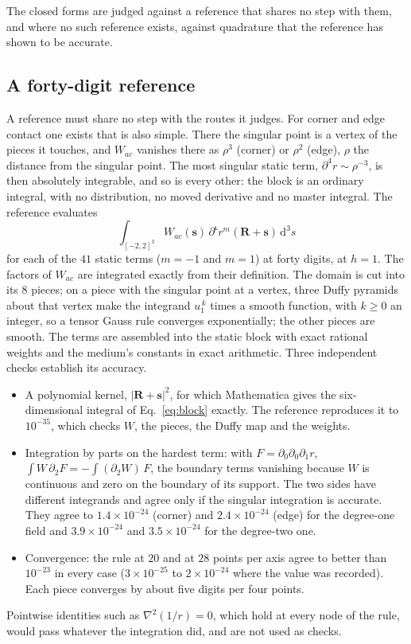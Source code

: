 \documentclass[11pt,a4paper]{article}
\newcommand{\bR}{\mathbf{R}}
\newcommand{\bs}{\mathbf{s}}
\newcommand{\biota}{\boldsymbol{\iota}}
\newcommand{\dd}{\mathrm{d}}
\begin{document}
The closed forms are judged against a reference that shares no step with them, and where no such
reference exists, against quadrature that the reference has shown to be accurate.

\subsection{A forty-digit reference}\label{sec:reference}

A reference must share no step with the routes it judges. For corner and edge contact one exists that is
also simple. There the singular point is a vertex of the pieces it touches, and $W_{ac}$ vanishes there as
$\rho^3$ (corner) or $\rho^2$ (edge), $\rho$ the distance from the singular point. The most singular static
term, $\partial^4r\sim\rho^{-3}$, is then absolutely integrable, and so is every other: the block is an
ordinary integral, with no distribution, no moved derivative and no master integral.
The reference evaluates
\begin{equation}\label{eq:reference}
  \int_{[-2,2]^3}W_{ac}(\bs)\,\partial^{\biota} r^m(\bR+\bs)\,\dd^3s
\end{equation}
for each of the $41$ static terms ($m=-1$ and $m=1$) at forty digits, at $h=1$. The factors of $W_{ac}$
are integrated exactly from their definition. The domain is cut into its $8$ pieces; on a piece with the
singular point at a vertex, three Duffy pyramids \citep{Duffy1982} about that vertex make the integrand
$u_1^{\,k}$ times a smooth function, with $k\ge0$ an integer, so a tensor Gauss rule converges
exponentially; the other pieces are smooth. The terms are assembled into the static block with exact
rational weights and the medium's constants in exact arithmetic. Three independent checks establish its
accuracy.
\begin{itemize}
  \item[(a)] A polynomial kernel, $|\bR+\bs|^2$, for which Mathematica gives the six-dimensional integral
  of Eq.~\eqref{eq:block} exactly. The reference reproduces it to $10^{-35}$, which checks $W$, the
  pieces, the Duffy map and the weights.
  \item[(b)] Integration by parts on the hardest term: with $F=\partial_0\partial_0\partial_1r$,
  $\int W\,\partial_2F=-\int(\partial_2W)\,F$, the boundary terms vanishing because $W$ is continuous and
  zero on the boundary of its support. The two sides have different integrands and agree only if the
  singular integration is accurate. They agree to $1.4\times10^{-24}$ (corner) and $2.4\times10^{-24}$
  (edge) for the degree-one field and $3.9\times10^{-24}$ and $3.5\times10^{-24}$ for the degree-two one.
  \item[(c)] Convergence: the rule at $20$ and at $28$ points per axis agree to better than
  $10^{-23}$ in every case ($3\times10^{-25}$ to $2\times10^{-24}$ where the value was recorded). Each piece
  converges by about five digits per four points.
\end{itemize}
Pointwise identities such as $\nabla^2(1/r)=0$, which hold at every node of the rule, would pass whatever
the integration did, and are not used as checks.
\end{document}
